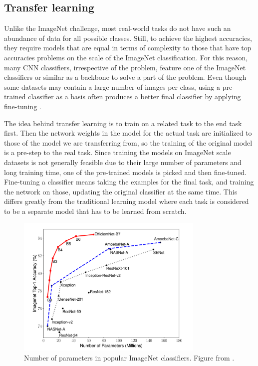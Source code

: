 \subsection{Transfer learning}
Unlike the ImageNet challenge, most real-world tasks do not have such an abundance of data for all possible classes. Still, to achieve the highest accuracies, they require models that are equal in terms of complexity to those that have top accuracies problems on the scale of the ImageNet classification. For this reason, many CNN classifiers, irrespective of the problem, feature one of the ImageNet classifiers or similar as a backbone to solve a part of the problem. Even though some datasets may contain a large number of images per class, using a pre-trained classifier as a basis often produces a better final classifier by applying fine-tuning \citep{betterTransfer}.

The idea behind transfer learning is to train on a related task to the end task first. Then the network weights in the model for the actual task are initialized to those of the model we are transferring from, so the training of the original model is a pre-step to the real task. Since training the models on ImageNet scale datasets is not generally feasible due to their large number of parameters and long training time, one of the pre-trained models is picked and then fine-tuned. Fine-tuning a classifier means taking the examples for the final task, and training the network on those, updating the original classifier at the same time. This differs greatly from the traditional learning model where each task is considered to be a separate model that has to be learned from scratch.

\begin{figure}[h!] 
\centering 
\includegraphics[width=0.8\textwidth]{imgs/imagenet_parameters.png}
\caption{Number of parameters in popular ImageNet classifiers. Figure from \citep{efficientNet}.\label{fig:params}}
\end{figure}

